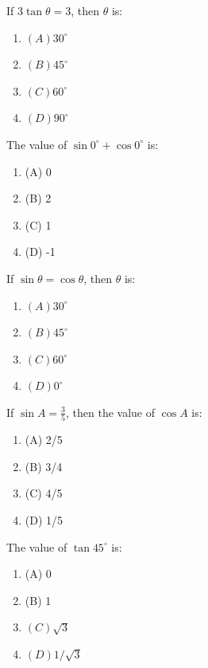 \documentclass[12pt,a4paper]{exam}
\begin{document}
\begin{questions}
\question[1] If $3\tan \theta = 3$, then $\theta$ is:
\begin{enumerate}[label=(\Alph*)]
  \item $(A) 30^\circ$
  \item $(B) 45^\circ$
  \item $(C) 60^\circ$
  \item $(D) 90^\circ$
\end{enumerate}
\vspace{0.15cm}

\question[1] The value of $\sin 0^\circ + \cos 0^\circ$ is:
\begin{enumerate}[label=(\Alph*)]
  \item (A) 0
  \item (B) 2
  \item (C) 1
  \item (D) -1
\end{enumerate}
\vspace{0.15cm}

\question[1] If $\sin \theta = \cos \theta$, then $\theta$ is:
\begin{enumerate}[label=(\Alph*)]
  \item $(A) 30^\circ$
  \item $(B) 45^\circ$
  \item $(C) 60^\circ$
  \item $(D) 0^\circ$
\end{enumerate}
\vspace{0.15cm}

\question[1] If $\sin A = \frac{3}{5}$, then the value of $\cos A$ is:
\begin{enumerate}[label=(\Alph*)]
  \item (A) 2/5
  \item (B) 3/4
  \item (C) 4/5
  \item (D) 1/5
\end{enumerate}
\vspace{0.15cm}

\question[1] The value of $\tan 45^\circ$ is:
\begin{enumerate}[label=(\Alph*)]
  \item (A) 0
  \item (B) 1
  \item $(C) \sqrt{3}$
  \item $(D) 1/\sqrt{3}$
\end{enumerate}
\vspace{0.15cm}


\end{questions}
\end{document}
